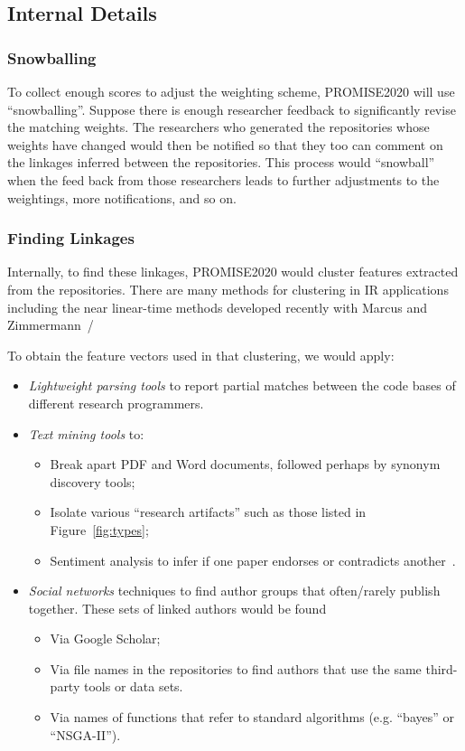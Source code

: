 \documentclass[journal]{IEEEtran}
\newcommand{\bi}{\begin{itemize}}
\newcommand{\ei}{\end{itemize}}
\newcommand{\fig}[1]{Figure~\ref{fig:#1}}
\begin{document}
\subsection{Internal Details}

\subsubsection{Snowballing}
To collect enough scores to adjust the weighting scheme, PROMISE2020 will use ``snowballing''. 
Suppose  there is enough researcher feedback to significantly revise the matching weights.
The researchers who generated the repositories whose weights have changed would then be notified so that they too can comment on the linkages inferred between the repositories.
This process would ``snowball'' when the feed back from those researchers leads to further adjustments to the weightings, more notifications, and so on.

\subsubsection{Finding Linkages}
Internally, to find these linkages, PROMISE2020  would cluster features extracted from the repositories.  There are many methods for clustering in IR applications including
the near linear-time methods developed recently with Marcus and Zimmermann~\cite{me12d}/


To  obtain the feature vectors used in that clustering,  we would apply:
\bi
\item {\em Lightweight parsing tools} to report partial matches between the
code bases of different research programmers.
\item
{\em Text mining tools} to:
\bi
\item Break apart PDF and Word documents, followed perhaps by synonym discovery tools;
\item Isolate various ``research artifacts'' such as those listed in \fig{types};
\item Sentiment analysis to infer if one paper endorses or  contradicts another~\cite{Pang08}.
\ei
\item
{\em Social networks} techniques to find 
author groups that often/rarely publish together.
These sets of linked authors would be found
\bi
\item
Via Google Scholar;
\item 
Via file names in the repositories to find authors that use the same third-party tools
or data sets.
\item
Via names of functions that refer to standard algorithms (e.g. ``bayes'' or
``NSGA-II'').
\ei
\ei
\end{document}
